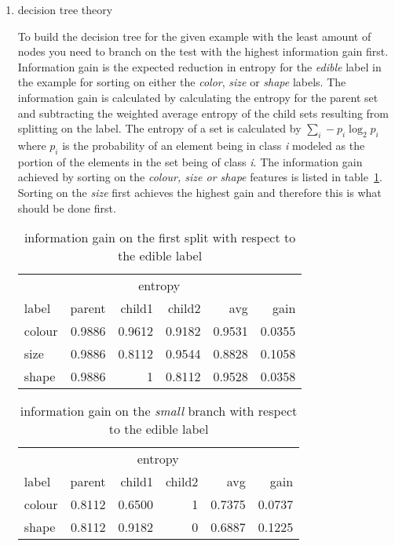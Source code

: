 \documentclass[11pt]{article}
\begin{document}
\begin{enumerate}

\item decision tree theory

To build the decision tree for the given example with the least amount of nodes you need to branch on the test with the highest information gain first. Information gain is the expected reduction in entropy for the \emph{edible} label in the example for sorting on either the \emph{color}, \emph{size} or \emph{shape} labels. The information gain is calculated by calculating the entropy for the parent set and subtracting the weighted average entropy of the child sets resulting from splitting on the label. The entropy of a set is calculated by $\sum\limits_i - p_i \log_2 p_i $ where $p_i$ is the probability of an element being in class \emph{i} modeled as the portion of the elements in the set being of class \emph{i}. The information gain achieved by sorting on the \emph{colour, size or shape} features is listed in table~\ref{tab:gain}. Sorting on the \emph{size} first achieves the highest gain and therefore this is what should be done first.

\begin{table}[h]\footnotesize
\label{tab:gain}
\begin{tabular}{ l r r r r r }
& \multicolumn{4}{c}{entropy} & \\
\cline{2-5}
label & parent & child1 & child2 & avg & gain \\
\hline
colour & 0.9886 & 0.9612 & 0.9182 & 0.9531 & 0.0355 \\
size & 0.9886 & 0.8112 & 0.9544 & 0.8828 & 0.1058 \\
shape & 0.9886 & 1 & 0.8112 & 0.9528 & 0.0358 \\
\end{tabular}
\caption{information gain on the first split with respect to the edible label}
\end{table}



\begin{table}[h]\footnotesize
\label{tab:gain-small}
\begin{tabular}{ l r r r r r }
& \multicolumn{4}{c}{entropy} & \\
\cline{2-5}
label & parent & child1 & child2 & avg & gain \\
\hline
colour & 0.8112 & 0.6500 & 1 & 0.7375 & 0.0737 \\
shape & 0.8112 & 0.9182 & 0 & 0.6887 & 0.1225 \\
\end{tabular}
\caption{information gain on the \emph{small} branch with respect to the edible label}
\end{table}


\end{enumerate}
\end{document}
